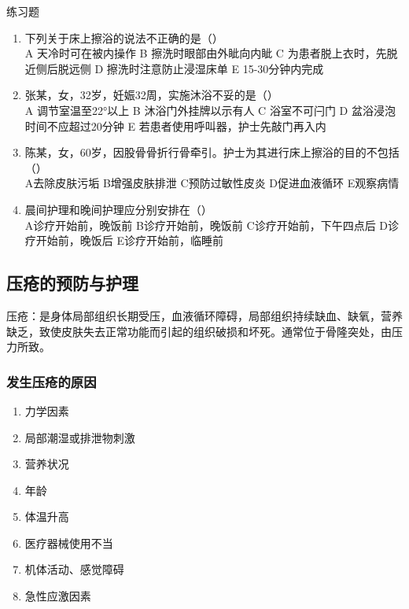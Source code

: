\documentclass[11pt, a4paper]{ctexart}
\begin{document}
\begin{examplebox}{练习题}
	\begin{enumerate}
		\item 下列关于床上擦浴的说法不正确的是（\qquad）\\
		      A 天冷时可在被内操作 \quad B 擦洗时眼部由外眦向内眦 \quad C 为患者脱上衣时，先脱近侧后脱远侧 \quad D 擦洗时注意防止浸湿床单 \quad E 15-30分钟内完成
		\item 张某，女，32岁，妊娠32周，实施沐浴不妥的是（\qquad）\\
		      A 调节室温至22°以上 \quad B 沐浴门外挂牌以示有人 \quad C 浴室不可闩门 \quad D 盆浴浸泡时间不应超过20分钟 \quad E 若患者使用呼叫器，护士先敲门再入内
		\item 陈某，女，60岁，因股骨骨折行骨牵引。护士为其进行床上擦浴的目的不包括（\qquad）\\
		      A去除皮肤污垢 \quad B增强皮肤排泄 \quad C预防过敏性皮炎 \quad D促进血液循环 \quad E观察病情
		\item 晨间护理和晚间护理应分别安排在（\qquad）\\
		      A诊疗开始前，晚饭前 \quad B诊疗开始前，晚饭前 \quad C诊疗开始前，下午四点后 \quad D诊疗开始前，晚饭后 \quad E诊疗开始前，临睡前
	\end{enumerate}
\end{examplebox}

\subsection{压疮的预防与护理}
压疮：是身体局部组织长期受压，血液循环障碍，局部组织持续缺血、缺氧，营养缺乏，致使皮肤失去正常功能而引起的组织破损和坏死。通常位于骨隆突处，由压力所致。

\subsubsection{发生压疮的原因}
\begin{enumerate}
	\item 力学因素
	\item 局部潮湿或排泄物刺激
	\item 营养状况
	\item 年龄
	\item 体温升高
	\item 医疗器械使用不当
	\item 机体活动、感觉障碍
	\item 急性应激因素
\end{enumerate}
\end{document}
